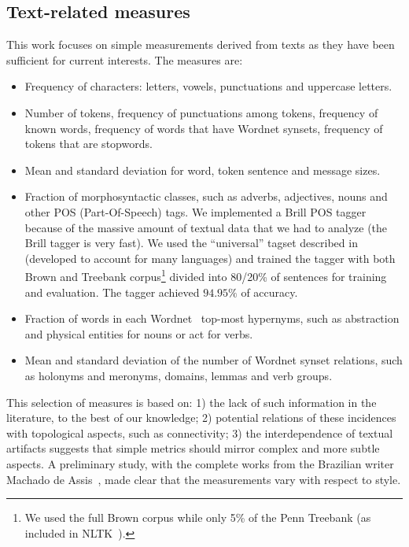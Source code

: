 \documentclass[review]{elsarticle}
\begin{document}
\subsection{Text-related measures}
This work focuses on simple measurements derived from texts as they have been sufficient for current interests.
The measures are:
\begin{itemize}
\item Frequency of characters: letters, vowels, punctuations and uppercase letters.
\item Number of tokens, frequency of punctuations among tokens, frequency of known words, frequency of words that have Wordnet synsets, frequency of tokens that are stopwords.
\item Mean and standard deviation for word, token sentence and message sizes.
\item Fraction of morphosyntactic classes, such as adverbs, adjectives, nouns and other POS (Part-Of-Speech) tags.
	We implemented a Brill POS tagger because of the massive amount of textual data that we had to analyze (the Brill tagger is very fast).
	We used the ``universal'' tagset described in~\cite{petrov} (developed to account for many languages) and trained the tagger with both Brown and Treebank corpus\footnote{We
		used the full Brown corpus while only 5\% of the Penn Treebank (as included in NLTK~\cite{trabNLTK}).}
	divided into 80/20\% of sentences for training and evaluation. The tagger achieved $94.95\%$ of accuracy.
\item Fraction of words in each Wordnet~\cite{wordnet} top-most hypernyms,
such as abstraction and physical entities for nouns or act for verbs.
\item Mean and standard deviation of the number of Wordnet synset relations, such as holonyms and meronyms, domains, lemmas and verb groups.
\end{itemize}

This selection of measures is based on: 1) the lack of such information in the literature, to the best of our knowledge; 
2) potential relations of these incidences with topological aspects, such as connectivity;
3) the interdependence of textual artifacts suggests that simple metrics should mirror complex and more subtle aspects.
A preliminary study, with the complete works from the Brazilian writer Machado de Assis~\cite{machado},
made clear that the measurements vary with respect to style.
\end{document}
